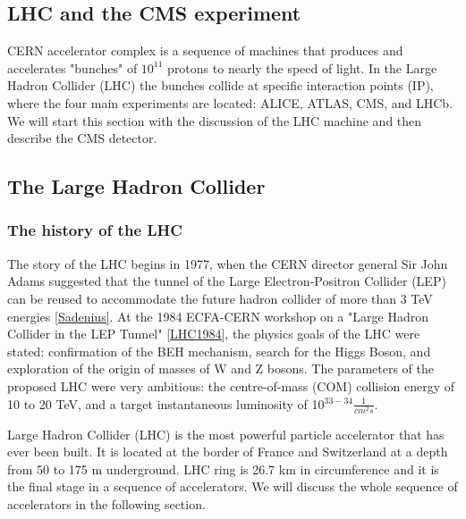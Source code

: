 
\begin{normalsize}



\chapter{LHC and the CMS experiment}
\label{ch:cms}
CERN accelerator complex is a sequence of machines that produces and accelerates "bunches" of $10^{11}$ protons to nearly the speed of light. In the Large Hadron Collider (LHC) the bunches collide at specific interaction points (IP), where the four main experiments are located: ALICE, ATLAS, CMS, and LHCb. We will start this section with the discussion of the LHC machine and then describe the CMS detector. 

\section{The Large Hadron Collider}\label{sec:cms_intro}



\subsection{The history of the LHC}

The story of the LHC begins in 1977, when the CERN director general Sir John Adams suggested that the tunnel of the Large Electron-Positron Collider (LEP) can be reused to accommodate the future hadron collider of more than 3 TeV energies \ref{Sadenius}. At the 1984 ECFA-CERN workshop on a "Large Hadron Collider in the LEP Tunnel" \ref{LHC1984}, the physics goals of the LHC were stated: confirmation of the BEH mechanism, search for the Higgs Boson, and exploration of the origin of masses of W and Z bosons. The parameters of the proposed LHC were very ambitious: the centre-of-mass (COM) collision energy of 10 to 20 TeV, and a target instantaneous luminosity of 10$^{33-34}\frac{1}{cm^{2}s}$. 

Large Hadron Collider (LHC) is the most powerful particle accelerator that has ever been built. It is located at the border of France and Switzerland at a depth from 50 to 175 m underground. LHC ring is 26.7 km in circumference and it is the final stage in a sequence of accelerators. We will discuss the whole sequence of accelerators in the following section.




\end{normalsize}
